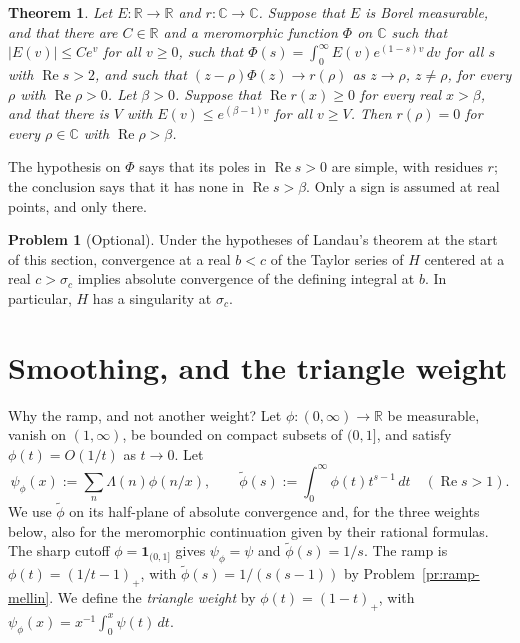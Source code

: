 \documentclass[reqno]{amsart}
\theoremstyle{definition}
\newtheorem{problem}{Problem}[section]
\theoremstyle{plain}
\newtheorem{theorem}{Theorem}[section]
\newcommand{\C}{\mathbb{C}}
\newcommand{\R}{\mathbb{R}}
\renewcommand{\Re}{\operatorname{Re}}
\newcommand{\one}{\mathbf{1}}
\begin{document}
\begin{theorem}\label{thm:landau-polar}
Let $E \colon \R \to \R$ and $r \colon \C \to \C$.  Suppose that $E$ is Borel measurable, and that there are $C \in \R$ and a meromorphic function $\Phi$ on $\C$ such that $\lvert E(v) \rvert \le C e^v$ for all $v \ge 0$, such that $\Phi(s) = \int_0^\infty E(v) e^{(1-s)v} \, d v$ for all $s$ with $\Re s > 2$, and such that $(z - \rho)\Phi(z) \to r(\rho)$ as $z \to \rho$, $z \ne \rho$, for every $\rho$ with $\Re \rho > 0$.  Let $\beta > 0$.  Suppose that $\Re r(x) \ge 0$ for every real $x > \beta$, and that there is $V$ with $E(v) \le e^{(\beta - 1)v}$ for all $v \ge V$.  Then $r(\rho) = 0$ for every $\rho \in \C$ with $\Re \rho > \beta$.
\end{theorem}

The hypothesis on $\Phi$ says that its poles in $\Re s > 0$ are simple, with residues $r$; the conclusion says that it has none in $\Re s > \beta$.  Only a sign is assumed at real points, and only there.

\begin{problem}[Optional]\label{pr:landau-taylor}
Under the hypotheses of Landau's theorem at the start of this section, convergence at a real $b < c$ of the Taylor series of $H$ centered at a real $c > \sigma_c$ implies absolute convergence of the defining integral at $b$.  In particular, $H$ has a singularity at $\sigma_c$.
\end{problem}

\section{Smoothing, and the triangle weight}\label{sec:smoothing}

Why the ramp, and not another weight?  Let $\phi \colon (0, \infty) \to \R$ be measurable, vanish on $(1, \infty)$, be bounded on compact subsets of $(0, 1]$, and satisfy $\phi(t) = O(1/t)$ as $t \to 0$.  Let
\[
  \psi_\phi(x) := \sum_n \Lambda(n) \phi(n/x) ,
  \qquad
  \tilde\phi(s) := \int_0^\infty \phi(t) t^{s-1} \, d t \quad (\Re s > 1) .
\]
We use $\tilde\phi$ on its half-plane of absolute convergence and, for the three weights below, also for the meromorphic continuation given by their rational formulas.  The sharp cutoff $\phi = \one_{(0,1]}$ gives $\psi_\phi = \psi$ and $\tilde\phi(s) = 1/s$.  The ramp is $\phi(t) = (1/t - 1)_+$, with $\tilde\phi(s) = 1/(s(s-1))$ by Problem~\ref{pr:ramp-mellin}.  We define the \emph{triangle weight} by $\phi(t) = (1 - t)_+$, with $\psi_\phi(x) = x^{-1}\int_0^x \psi(t) \, d t$.
\end{document}
